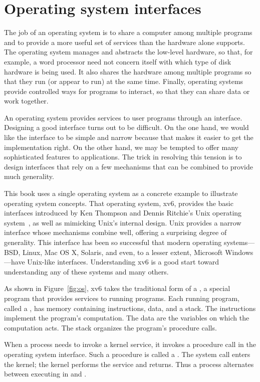 \chapter{Operating system interfaces}
\label{CH:UNIX}

The job of an operating system is to share a computer among
multiple programs and to provide a more useful set of services
than the hardware alone supports.
The operating system manages and abstracts
the low-level hardware, so that, for example,
a word processor need not concern itself with which type
of disk hardware is being used.
It also shares the hardware among multiple programs so
that they run (or appear to run) at the same time.
Finally, operating systems provide controlled ways for programs
to interact, so that they can share data or work together.

An operating system provides services to user programs through an interface.
Designing a good interface turns out to be
difficult.  On the one hand, we would like the interface to be
simple and narrow because that makes it easier to get the
implementation right.  On the other hand,
we may be tempted to offer many sophisticated features to applications.
The trick in
resolving this tension is to design interfaces that rely on a few
mechanisms that can be combined to provide much generality.

This book uses a single operating system as a concrete example to
illustrate operating system concepts.  That operating system,
xv6, provides the basic interfaces introduced by Ken Thompson and
Dennis Ritchie's Unix operating system~\cite{unix}, as well as mimicking Unix's
internal design.  Unix provides a
narrow interface whose mechanisms combine well, offering a surprising
degree of generality.  This interface has been so successful that
modern operating systems—BSD, Linux, Mac OS X, Solaris, and even, to a
lesser extent, Microsoft Windows—have Unix-like interfaces.
Understanding xv6 is a good start toward understanding any of these
systems and many others.

As shown in 
Figure~\ref{fig:os},
xv6 takes the traditional form of a
,
a special program that provides
services to running programs.
Each running program, called a
,
has memory containing instructions, data, and a stack. The
instructions implement the
program's computation.  The data are the variables on which
the computation acts. The stack organizes the program's procedure calls.

When a
process needs to invoke a kernel service, it invokes a procedure call
in the operating system interface.  Such a procedure is called a
.
The system call enters the kernel;
the kernel performs the service and returns.
Thus a process alternates between executing in
and
.

